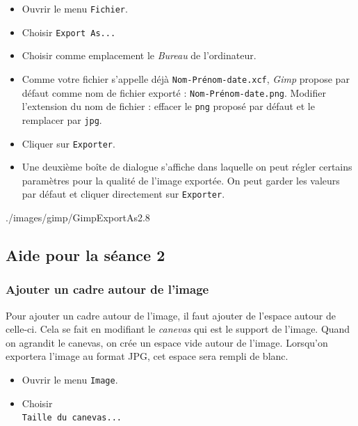 \begin{itemize}
\item Ouvrir le menu \texttt{Fichier}.
\item Choisir \texttt{Export As...}
\item Choisir comme emplacement le \emph{Bureau} de l'ordinateur.
\item Comme votre fichier s'appelle déjà \texttt{Nom-Prénom-date.xcf}, \emph{Gimp} propose par défaut comme nom de fichier exporté : \texttt{Nom-Prénom-date.png}. Modifier l'extension du nom de fichier : effacer le \texttt{png} proposé par défaut et le remplacer par \texttt{jpg}.
\item Cliquer sur \texttt{Exporter}.
\item Une deuxième boîte de dialogue s'affiche dans laquelle on peut régler certains paramètres pour la qualité de l'image exportée. On peut garder les valeurs par défaut et cliquer directement sur \texttt{Exporter}.
\end{itemize}
%
		      {./images/gimp/GimpExportAs2}{.8\textwidth}

\subsection{Aide pour la séance 2}


\subsubsection{Ajouter un cadre autour de l'image}\label{GimpCadre}

Pour ajouter un cadre autour de l'image, il faut ajouter de l'espace autour de celle-ci. Cela se fait en modifiant le \emph{canevas} qui est le support de l'image. Quand on agrandit le canevas, on crée un espace vide autour de l'image. Lorsqu'on exportera l'image au format JPG, cet espace sera rempli de blanc.


\begin{minipage}[c]{.38\textwidth}
\begin{itemize}
\item Ouvrir le menu \texttt{Image}.
\item Choisir\\ \texttt{Taille du canevas...}
\end{itemize}
\end{minipage}\hfill%
\begin{minipage}[c]{.58\textwidth}
\end{minipage}

